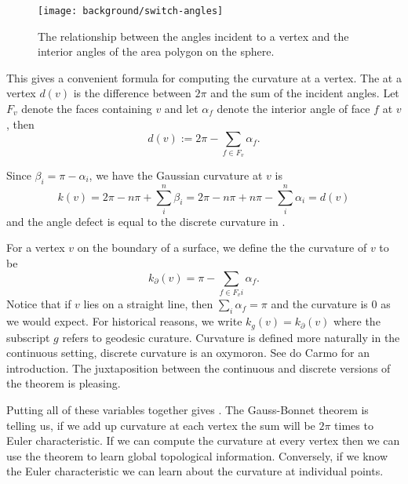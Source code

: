 \begin{figure}[htb]
\centering
\texttt{[image: background/switch-angles]}
\caption{The relationship between the angles incident to a vertex and
the interior angles of the area polygon on the sphere.}
\label{fig:switcheroo}
\end{figure}




This gives a convenient formula for computing the curvature at a vertex.
The  at a vertex $d(v)$ is the difference between $2\pi$ and
the sum of the incident angles.  Let $F_v$ denote the faces containing $v$  
and let $\alpha_f$  denote the interior  angle of face $f$ at $v$, then
$$d(v):=2\pi -\sum_{f\in F_v}\alpha_f.$$

Since $\beta_i=\pi-\alpha_i$, we have the Gaussian curvature at $v$
is 
$$k(v)=2\pi -n\pi+\sum_{i}^n \beta_i=2\pi-n\pi +n\pi -\sum_i^n\alpha_i=d(v)$$
 and the
 angle defect is equal to the discrete curvature in .


For a vertex $v$ on the boundary of a surface, we define the the curvature
of $v$  to be 
$$k_{\partial}(v)= \pi-\sum_{f\in F_vi}\alpha_f.$$
Notice that if $v$ lies on a straight line, then $\sum_{i}\alpha_f=\pi$
and the curvature is $0$ as we would expect.
For historical reasons,  we write $k_g(v)=k_{\partial}(v)$
where the subscript $g$ refers to geodesic curature.
Curvature is defined more naturally in the continuous setting,
discrete curvature is an oxymoron.  See do Carmo \cite{doc76} for an introduction.
The juxtaposition between the continuous and discrete versions of the theorem
is pleasing.



Putting all of these variables together gives .
The  Gauss-Bonnet theorem is  telling us, if we add up curvature
at each vertex the sum will be $2\pi$ times to Euler characteristic.
If we can compute the curvature at every vertex then we can use the theorem
to learn global topological information.
Conversely, if we know the Euler characteristic we can learn about the curvature
at individual points.
